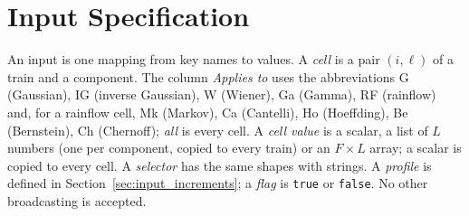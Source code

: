 \renewcommand{\_}{\textunderscore\allowbreak{}}
\providecommand{\keyrow}[5]{{\raggedright #1\par} & {\raggedright #2\par} & {\raggedright #3\par} & {\raggedright #4\par} & {\raggedright #5\par} \\}
\providecommand{\optrow}[4]{{\raggedright #1\par} & {\raggedright #2\par} & {\raggedright #3\par} & {\raggedright #4\par} \\}
\providecommand{\rejrow}[2]{{\raggedright #1\par} & {\raggedright #2\par} \\}
\providecommand{\typerow}[3]{{\raggedright #1\par} & {\raggedright #2\par} & {\raggedright #3\par} \\}
\providecommand{\tabstart}[2]{\begingroup\small\begin{longtable}{@{}#1@{}}\toprule #2 \\ \midrule \endhead}
\providecommand{\tabend}{\bottomrule\end{longtable}\endgroup}
\providecommand{\keytab}{\tabstart{p{3.2cm}p{2.2cm}p{1.8cm}p{1.9cm}p{4.5cm}}{Key & Shape & Default & Applies to & Meaning}}

\section{Input Specification}\label{sec:inputs}

An input is one mapping from key names to values.
A \emph{cell} is a pair $(i,\ell)$ of a train and a component.
The column \emph{Applies to} uses the abbreviations G (Gaussian), IG (inverse Gaussian), W (Wiener), Ga (Gamma), RF (rainflow) and, for a rainflow cell, Mk (Markov), Ca (Cantelli), Ho (Hoeffding), Be (Bernstein), Ch (Chernoff); \emph{all} is every cell.
A \emph{cell value} is a scalar, a list of $L$ numbers (one per component, copied to every train) or an $F \times L$ array; a scalar is copied to every cell.
A \emph{selector} has the same shapes with strings.
A \emph{profile} is defined in Section~\ref{sec:input_increments}; a \emph{flag} is \texttt{true} or \texttt{false}.
No other broadcasting is accepted.


